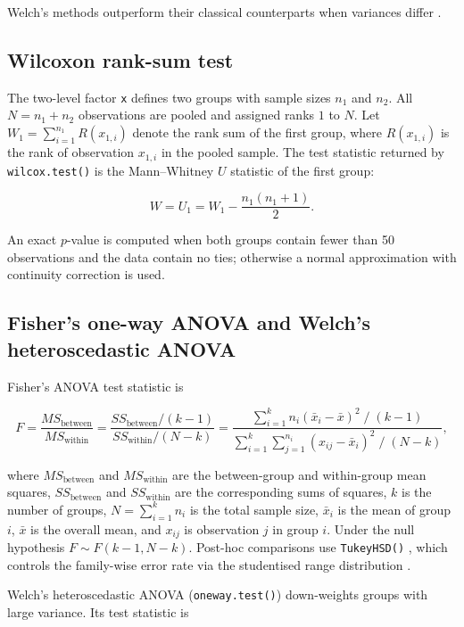 Welch's methods outperform their classical counterparts when variances
differ \citep{Moser:1992, Fagerland:2009, Delacre:2017}.

\subsection{Wilcoxon rank-sum test}\label{wilc}

The two-level factor \texttt{x} defines two groups with sample sizes \(n_1\) and
\(n_2\). All \(N = n_1 + n_2\) observations are pooled and assigned ranks
\(1\) to \(N\). Let \(W_1 = \sum_{i=1}^{n_1} R(x_{1,i})\) denote the rank sum
of the first group, where \(R(x_{1,i})\) is the rank of observation
\(x_{1,i}\) in the pooled sample. The test statistic returned by
\texttt{wilcox.test()} \citep{Mann:1947} is the Mann--Whitney \(U\) statistic of the
first group:

\[W = U_1 = W_1 - \frac{n_1(n_1+1)}{2}.\]

An exact \(p\)-value is computed when both groups contain fewer than 50
observations and the data contain no ties; otherwise a normal
approximation with continuity correction is used.

\subsection{Fisher's one-way ANOVA and Welch's heteroscedastic ANOVA}\label{aov}

Fisher's ANOVA test statistic \citep{Fisher:1990} is

\[F = \frac{MS_\text{between}}{MS_\text{within}}
   = \frac{SS_\text{between}/(k-1)}{SS_\text{within}/(N-k)}
   = \frac{\displaystyle\sum_{i=1}^{k} n_i (\bar{x}_i - \bar{x})^2\;/\;(k-1)}
          {\displaystyle\sum_{i=1}^{k}\sum_{j=1}^{n_i}(x_{ij}-\bar{x}_i)^2\;/\;(N-k)},\]

where \(MS_\text{between}\) and \(MS_\text{within}\) are the between-group
and within-group mean squares, \(SS_\text{between}\) and
\(SS_\text{within}\) are the corresponding sums of squares, \(k\) is the
number of groups, \(N = \sum_{i=1}^k n_i\) is the total sample size,
\(\bar{x}_i\) is the mean of group \(i\), \(\bar{x}\) is the overall mean, and
\(x_{ij}\) is observation \(j\) in group \(i\). Under the null hypothesis
\(F \sim F(k-1, N-k)\). Post-hoc comparisons use
\texttt{TukeyHSD()} \citep{Hochberg:1987}, which controls the family-wise error rate
via the studentised range distribution \citep{Abdi:2007}.

Welch's heteroscedastic ANOVA (\texttt{oneway.test()}) \citep{Welch:1951}
down-weights groups with large variance. Its test statistic is

